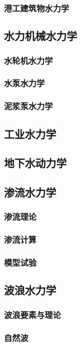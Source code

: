 \documentclass[UTF8]{../../ApplicationUniverse}
\begin{document}
        \subsubsection{港工建筑物水力学}
    \subsection{水力机械水力学}
        \subsubsection{水轮机水力学}
        \subsubsection{水泵水力学}
        \subsubsection{泥浆泵水力学}
    \subsection{工业水力学}
    \subsection{地下水动力学}
    \subsection{渗流水力学}
        \subsubsection{渗流理论}
        \subsubsection{渗流计算}
        \subsubsection{模型试验}
    \subsection{波浪水力学}
        \subsubsection{波浪要素与理论}
        \subsubsection{自然波}
\end{document}

